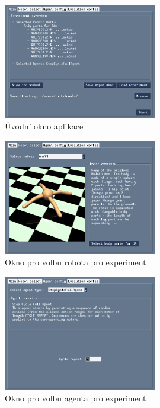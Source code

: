\begin{figure}[!htb]
    \centering
    \includegraphics[width=0.6\textwidth]{../img/GUI_main_tab.jpg}
    \caption{Úvodní okno aplikace}
    \label{imp:fig:GUI_main}
\end{figure}
\begin{figure}[!htb]
    \centering
    \includegraphics[width=0.6\textwidth]{../img/GUI_robot_tab.jpg}
    \caption{Okno pro volbu robota pro experiment}
    \label{imp:fig:GUI_robot}
\end{figure}
\begin{figure}[!htb]
    \centering
    \includegraphics[width=0.6\textwidth]{../img/GUI_agent_tab.jpg}
    \caption{Okno pro volbu agenta pro experiment}
    \label{imp:fig:GUI_agent}
\end{figure}
